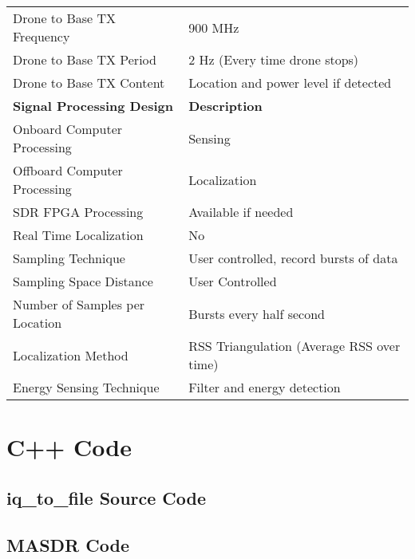\begin{table}[h]
\begin{tabular}{|l|l|}
            Drone to Base TX Frequency            & 900 MHz                                   \\
            Drone to Base TX Period               & 2 Hz (Every time drone stops)             \\
            Drone to Base TX Content              & Location and power level if detected      \\
    \hline  \textbf{Signal Processing Design}     & \textbf{Description}                      \\ \hline
            Onboard Computer Processing           & Sensing                                   \\
            Offboard Computer Processing          & Localization                              \\
            SDR FPGA Processing                   & Available if needed                       \\
            Real Time Localization                & No                                        \\
            Sampling Technique                    & User controlled, record bursts of data    \\
            Sampling Space Distance               & User Controlled                           \\
            Number of Samples per Location        & Bursts every half second                  \\
            Localization Method                   & RSS Triangulation (Average RSS over time) \\
            Energy Sensing Technique              & Filter and energy detection               \\ \hline
\end{tabular}
\end{table}\par
\pagebreak

\chapter{C++ Code}
\section{iq\_to\_file Source Code}\label{app:iq_to_file}

\pagebreak
\section{MASDR Code}\label{app:masdr_code}
